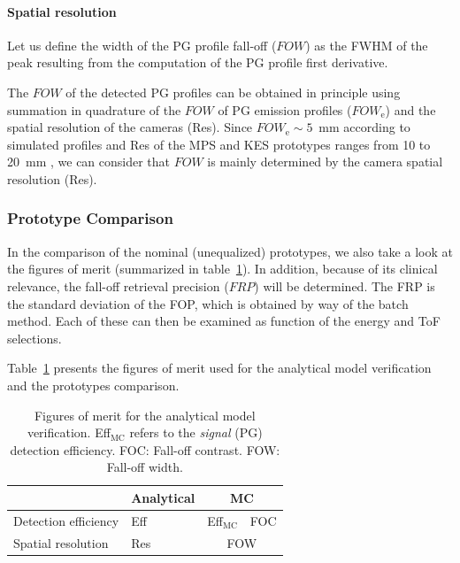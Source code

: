 \documentclass[a4paper,english]{article}
\begin{document}
\paragraph{Spatial resolution}

Let us define the width of the PG profile fall-off ($FOW$) as the FWHM of the peak resulting from the computation of the PG profile first derivative.

The $FOW$ of the detected PG profiles can be obtained in principle using summation in quadrature of the $FOW$ of PG emission profiles ($FOW_\text{e}$) and the spatial resolution of the cameras (Res). Since $FOW_\text{e}\sim5$~mm according to simulated profiles \citep{Krimmer2017a} and Res of the MPS and KES prototypes ranges from 10 to 20~mm \citep{Pinto2014a, Smeets2012}, we can consider that $FOW$ is mainly determined by the camera spatial resolution (Res). 


\subsubsection{Prototype Comparison}

In the comparison of the nominal (unequalized) prototypes, we also take a look at the figures of merit (summarized in table~\ref{table:FOM}). In addition, because of its clinical relevance, the fall-off retrieval precision ($FRP$) will be determined. The FRP is the standard deviation of the FOP, which is obtained by way of the batch method. Each of these can then be examined as function of the energy and ToF selections.



Table~\ref{table:FOM} presents the figures of merit used for the analytical model verification and the prototypes comparison.

\begin{table}[h]
\centering
\begin{tabular}{|l|l|c|c|}
	\hline
												& Analytical 		& \multicolumn{2}{c|}{ MC}\\
	\hline
	Detection efficiency	& Eff						& Eff$_\text{MC}$ 	& FOC \\
	\hline
	Spatial resolution 		& Res						& \multicolumn{2}{c|}{FOW}\\
	\hline	
\end{tabular}
\caption{Figures of merit for the analytical model verification. Eff$_\text{MC}$ refers to the \emph{signal} (PG) detection efficiency. FOC: Fall-off contrast. FOW: Fall-off width.}
\label{table:FOM}
\end{table}
\end{document}
